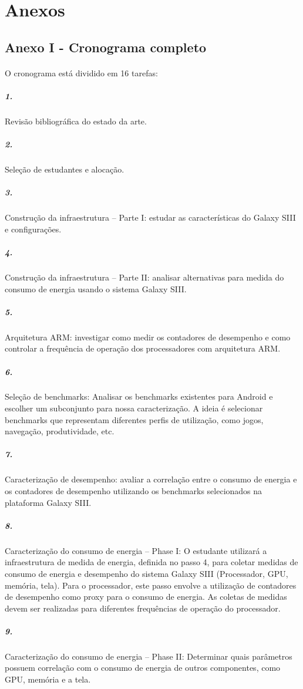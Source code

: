 \documentclass[11pt,a4paper,titlepage]{article}
\begin{document}
\section{Anexos}
\subsection{Anexo I - Cronograma completo}
\paragraph{} O cronograma está dividido em 16 tarefas:\\
\subparagraph{1.} Revisão bibliográfica do estado da arte. \\
\subparagraph{2.} Seleção de estudantes e alocação. \\
\subparagraph{3.} Construção da infraestrutura – Parte I: estudar as características do Galaxy SIII e configurações. \\
\subparagraph{4.} Construção da infraestrutura – Parte II: analisar alternativas para medida do consumo de energia usando o sistema Galaxy SIII.\\ 
\subparagraph{5.} Arquitetura ARM: investigar como medir os contadores de desempenho e como controlar a frequência de operação dos processadores com arquitetura ARM. \\
\subparagraph{6.} Seleção de benchmarks: Analisar os benchmarks existentes para Android e escolher um subconjunto para nossa caracterização. A ideia é selecionar benchmarks que representam diferentes perfis de utilização, como jogos, navegação, produtividade, etc. \\
\subparagraph{7.} Caracterização de desempenho: avaliar a correlação entre o consumo de energia e os contadores de desempenho utilizando os benchmarks selecionados na plataforma Galaxy SIII. \\
\subparagraph{8.} Caracterização do consumo de energia – Phase I: O estudante utilizará a infraestrutura de medida de energia, definida no passo 4, para coletar medidas de consumo de energia e desempenho do sistema Galaxy SIII (Processador, GPU, memória, tela). Para o processador, este passo envolve a utilização de contadores de desempenho como proxy para o consumo de energia. As coletas de medidas devem ser realizadas para diferentes frequências de operação do processador. \\
\subparagraph{9.} Caracterização do consumo de energia – Phase II: Determinar quais parâmetros possuem correlação com o consumo de energia de outros componentes, como GPU, memória e a tela. \\
\end{document}

